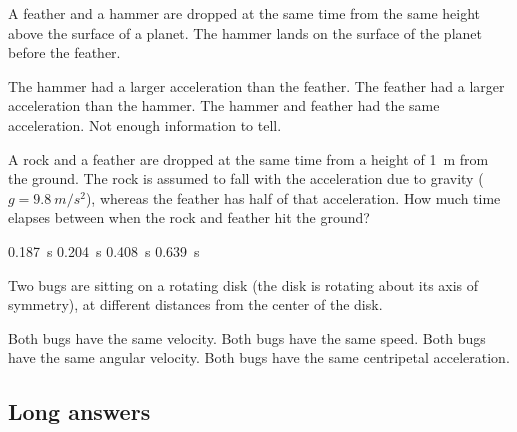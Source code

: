 \question A feather and a hammer are dropped at the same time from the same height above the surface of a planet. The hammer lands on the surface of the planet before the feather.
\begin{checkboxes}
\CorrectChoice The hammer had a larger acceleration than the feather.
\choice The feather had a larger acceleration than the hammer.
\choice The hammer and feather had the same acceleration.
\choice Not enough information to tell.
\end{checkboxes}

\question A rock and a feather are dropped at the same time from a height of \SI{1}{m} from the ground. The rock is assumed to fall with the acceleration due to gravity ($g=\SI{9.8}{m/s^2}$), whereas the feather has half of that acceleration. How much time elapses between when the rock and feather hit the ground?
\begin{choices} 
	\CorrectChoice \SI{0.187}{s}
	\choice  \SI{0.204}{s}
	\choice \SI{0.408}{s}
	\choice \SI{0.639}{s}
\end{choices}

\question Two bugs are sitting on a rotating disk (the disk is rotating about its axis of symmetry), at different distances from the center of the disk.
\begin{checkboxes}
\choice Both bugs have the same velocity.
\choice Both bugs have the same speed.
\CorrectChoice Both bugs have the same angular velocity.
\choice Both bugs have the same centripetal acceleration.
\end{checkboxes}

%
%
\subsection{Long answers}

